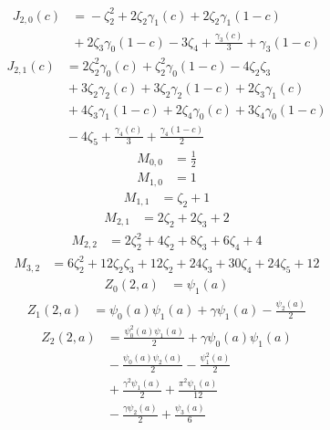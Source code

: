 \[
\begin{aligned}
J_{2,0}(c) &={} - \zeta_{2}^{2} + 2 \zeta_{2} \gamma_{1}{\left(c \right)} + 2 \zeta_{2} \gamma_{1}{\left(1 - c \right)}\\
&{} + 2 \zeta_{3} \gamma_{0}{\left(1 - c \right)} - 3 \zeta_{4} + \frac{\gamma_{3}{\left(c \right)}}{3} + \gamma_{3}{\left(1 - c \right)}
\end{aligned}
\]
\[
\begin{aligned}
J_{2,1}(c) &={} 2 \zeta_{2}^{2} \gamma_{0}{\left(c \right)} + \zeta_{2}^{2} \gamma_{0}{\left(1 - c \right)} - 4 \zeta_{2} \zeta_{3}\\
&{} + 3 \zeta_{2} \gamma_{2}{\left(c \right)} + 3 \zeta_{2} \gamma_{2}{\left(1 - c \right)} + 2 \zeta_{3} \gamma_{1}{\left(c \right)}\\
&{} + 4 \zeta_{3} \gamma_{1}{\left(1 - c \right)} + 2 \zeta_{4} \gamma_{0}{\left(c \right)} + 3 \zeta_{4} \gamma_{0}{\left(1 - c \right)}\\
&{} - 4 \zeta_{5} + \frac{\gamma_{4}{\left(c \right)}}{3} + \frac{\gamma_{4}{\left(1 - c \right)}}{2}
\end{aligned}
\]
\[
\begin{aligned}
M_{0,0} &={} \frac{1}{2}
\end{aligned}
\]
\[
\begin{aligned}
M_{1,0} &={} 1
\end{aligned}
\]
\[
\begin{aligned}
M_{1,1} &={} \zeta_{2} + 1
\end{aligned}
\]
\[
\begin{aligned}
M_{2,1} &={} 2 \zeta_{2} + 2 \zeta_{3} + 2
\end{aligned}
\]
\[
\begin{aligned}
M_{2,2} &={} 2 \zeta_{2}^{2} + 4 \zeta_{2} + 8 \zeta_{3} + 6 \zeta_{4} + 4
\end{aligned}
\]
\[
\begin{aligned}
M_{3,2} &={} 6 \zeta_{2}^{2} + 12 \zeta_{2} \zeta_{3} + 12 \zeta_{2} + 24 \zeta_{3} + 30 \zeta_{4} + 24 \zeta_{5} + 12
\end{aligned}
\]
\[
\begin{aligned}
Z_{0}(2,a) &={} \psi_{1}{\left(a \right)}
\end{aligned}
\]
\[
\begin{aligned}
Z_{1}(2,a) &={} \psi_{0}{\left(a \right)} \psi_{1}{\left(a \right)} + \gamma \psi_{1}{\left(a \right)} - \frac{\psi_{2}{\left(a \right)}}{2}
\end{aligned}
\]
\[
\begin{aligned}
Z_{2}(2,a) &={} \frac{\psi_{0}^{2}{\left(a \right)} \psi_{1}{\left(a \right)}}{2} + \gamma \psi_{0}{\left(a \right)} \psi_{1}{\left(a \right)}\\
&{} - \frac{\psi_{0}{\left(a \right)} \psi_{2}{\left(a \right)}}{2} - \frac{\psi_{1}^{2}{\left(a \right)}}{2}\\
&{} + \frac{\gamma^{2} \psi_{1}{\left(a \right)}}{2} + \frac{\pi^{2} \psi_{1}{\left(a \right)}}{12}\\
&{} - \frac{\gamma \psi_{2}{\left(a \right)}}{2} + \frac{\psi_{3}{\left(a \right)}}{6}
\end{aligned}
\]
